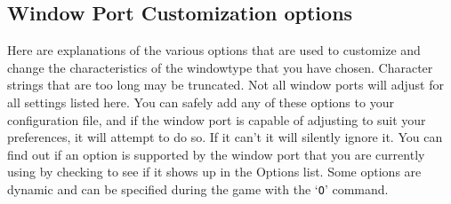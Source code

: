 \subsection*{Window Port Customization options}

Here are explanations of the various options that are
used to customize and change the characteristics of the
windowtype that you have chosen.
Character strings that are too long may be truncated.
Not all window ports will adjust for all settings listed
here.  You can safely add any of these options to your
configuration file, and if the window port is capable of adjusting
to suit your preferences, it will attempt to do so. If it
can't it will silently ignore it.  You can find out if an
option is supported by the window port that you are currently
using by checking to see if it shows up in the Options list.
Some options are dynamic and can be specified during the game
with the `{\tt O}' command.

